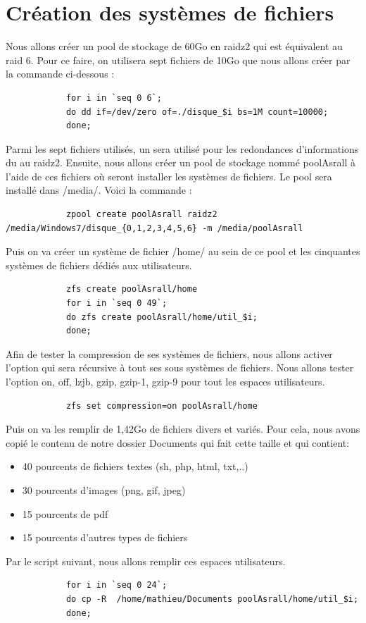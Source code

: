 \documentclass[a4paper]{report}
\begin{document}
	\section{Création des systèmes de fichiers}	
	 Nous allons créer un pool de stockage de 60Go en raidz2 qui est équivalent au raid 6. Pour ce faire, on utilisera sept fichiers de 10Go que nous allons créer par la commande ci-dessous :
		\begin{lstlisting}
			for i in `seq 0 6`;
			do dd if=/dev/zero of=./disque_$i bs=1M count=10000;
			done;
		\end{lstlisting}
	Parmi les sept fichiers utilisés, un sera utilisé pour les redondances d'informations du au raidz2. Ensuite, nous allons créer un pool de stockage nommé poolAsrall à l'aide de ces fichiers où seront installer les systèmes de fichiers. Le pool sera installé dans /media/. Voici la commande :
		\begin{lstlisting}
			zpool create poolAsrall raidz2 /media/Windows7/disque_{0,1,2,3,4,5,6} -m /media/poolAsrall
		\end{lstlisting}
	Puis on va créer un système de fichier /home/ au sein de ce pool et les cinquantes systèmes de fichiers dédiés aux utilisateurs.
		\begin{lstlisting}
			zfs create poolAsrall/home
			for i in `seq 0 49`;
			do zfs create poolAsrall/home/util_$i;
			done;
		\end{lstlisting}
	Afin de tester la compression de ses systèmes de fichiers, nous allons activer l'option qui sera récursive à tout ses sous systèmes de fichiers. Nous allons tester l'option on, off, lzjb, gzip, gzip-1, gzip-9 pour tout les espaces utilisateurs.
		\begin{lstlisting}
			zfs set compression=on poolAsrall/home
		\end{lstlisting}
	Puis on va les remplir de 1,42Go de fichiers divers et variés. Pour cela, nous avons copié le contenu de notre dossier Documents qui fait cette taille et qui contient:
		\begin{itemize}
			\item 40 pourcents de fichiers textes (sh, php, html, txt,..)
			\item 30 pourcents d'images (png, gif, jpeg)
			\item 15 pourcents de pdf
			\item 15 pourcents d'autres types de fichiers
		\end{itemize}
	Par le script suivant, nous allons remplir ces espaces utilisateurs.
		\begin{lstlisting}
			for i in `seq 0 24`;
			do cp -R  /home/mathieu/Documents poolAsrall/home/util_$i;
			done;
		\end{lstlisting}
\end{document}
